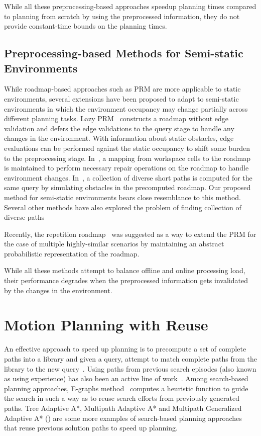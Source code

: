 \documentclass[a4paper]{report}
\begin{document}
While all these preprocessing-based approaches speedup planning times compared to planning from scratch by using the preprocessed information, they do not provide constant-time bounds on the planning times.

\subsection{Preprocessing-based Methods for Semi-static Environments}
While roadmap-based approaches such as PRM are more applicable to static environments, several extensions have been proposed to adapt to semi-static environments in which the environment occupancy may change partially across different planning tasks. Lazy PRM~\cite{kavraki2000path} constructs a roadmap without edge validation and defers the edge validations to the query stage to handle any changes in the environment. With information about static obstacles, edge evaluations can be performed against the static occupancy to shift some burden to the preprocessing stage.
In~\cite{leven2002framework}, a mapping from workspace cells to the roadmap is maintained to perform necessary repair operations on the roadmap to handle environment changes.
In~\cite{voss2015heuristic}, a collection of diverse short paths is computed for the same query by simulating obstacles in the precomputed roadmap. Our proposed method for semi-static environments bears close resemblance to this method. Several other methods have also explored the problem of finding collection of diverse paths~\cite{palmieri2016fast, liu2017finding, vadlamudi2016combinatorial}

Recently, the repetition roadmap~\cite{LA18} was suggested as a way to extend the PRM for the case of multiple highly-similar scenarios by maintaining an abstract probabilistic representation of the roadmap.

While all these methods attempt to balance offline and online processing load, their performance degrades when the preprocessed information gets invalidated by the changes in the environment.


\section{Motion Planning with Reuse}
An effective approach to speed up planning is to precompute a set of complete paths into a library and given a query, attempt to match complete paths from the library to the new query~\cite{berenson2012robot,jetchev2013fast}.
Using paths from previous search episodes (also known as using experience) has also been an active line of work~\cite{PCCL12,PDCL13,BAG12,CSMOC15}. Among search-based planning approaches, E-graphs method~\cite{PCCL12} computes a heuristic function to guide the search in such a way as to reuse search efforts from previously generated paths.
Tree Adaptive A*, Multipath Adaptive A* and Multipath Generalized Adaptive A* (\cite{hernandez2011tree, hernandez2014making, hernandez2015reusing}) are some more examples of search-based planning approaches that reuse previous solution paths to speed up planning.
\end{document}
